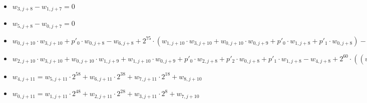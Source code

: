 \begin{itemize}
\item $w_{3, j + 8} - w_{1, j + 7} = 0$
\item $w_{5, j + 8} - w_{0, j + 7} = 0$

\item $w_{0, j + 10} \cdot w_{3, j + 10} + p'_0 \cdot w_{0, j + 8} - w_{6, j + 8} + 2^{75} \cdot (w_{1, j + 10} \cdot w_{3, j + 10} + w_{0, j + 10} \cdot w_{0, j + 9} + p'_0 \cdot w_{1, j + 8} + p'_1 \cdot w_{0, j + 8}) - w_{5, j + 8}\ dot 2^{75} - w_{7, j + 9} \cdot 2^{135} = 0$
\item $w_{2, j + 10} \cdot w_{3, j + 10} + w_{0, j + 10} \cdot w_{1, j + 9} + w_{1, j + 10} \cdot w_{0, j + 9} + p'_0 \cdot w_{2, j + 8} + p'_2 \cdot w_{0, j + 8} + p'_1 \cdot w_{1, j + 8} - w_{4, j + 8} + 2^{60} \cdot ((w_{4, j + 10} \cdot 2^{40} + w_{5, j + 10} \cdot 2^{20} + w_{6, j + 10}) \cdot w_{3, j + 10} + w_{0, j + 10} \cdot (w_{3, j + 9} \cdot 2^{40} + w_{4, j + 9} \cdot 2^{20} + w_{5, j + 9}) + w_{1, j + 10} \cdot w_{1, j + 9} + w_{2, j + 10} \cdot w_{0, j + 9} + p'_0 \cdot (w_{7, j + 8} \cdot 2^{40} + w_{8, j + 8} \cdot 2^{20} + w_{2, j + 9}) + p'_3 \cdot w_{0, j + 8} + p'_1 \cdot w_{2, j + 8} + p'_2 \cdot w_{1, j + 8}) - 2^{60} \cdot w_{3, j + 8} + 2^{120} \cdot ((w_{4, j + 10} \cdot 2^{40} + w_{5, j + 10} \cdot 2^{20} + w_{6, j + 10}) \cdot w_{0, j + 9} + w_{1, j + 10} \cdot(w_{3, j + 9} \cdot 2^{40} + w_{4, j + 9} \cdot 2^{20} + w_{5, j + 9}) + w_{2, j + 10} \cdot w_{1, j + 9} + p'_1 \cdot (w_{7, j + 8} \cdot 2^{40} + w_{8, j + 8} \cdot 2^{20} + w_{2, j + 9}) + p'_3 \cdot w_{1, j + 8} + p'_2 \cdot w_{2, j + 8}) + w_{7, j + 9} - 2^{122} \cdot w_{8, j + 9} = 0$
\item $w_{4, j + 11} = w_{5, j + 11} \cdot 2^{58} + w_{6, j + 11} \cdot 2^{38} + w_{7, j + 11} \cdot 2^{18} + w_{8, j + 10}$
\item $w_{0, j + 11} = w_{1, j + 11} \cdot 2^{48} + w_{2, j + 11} \cdot 2^{28} + w_{3, j + 11} \cdot 2^8 + w_{7, j +10}$
\end{itemize}

